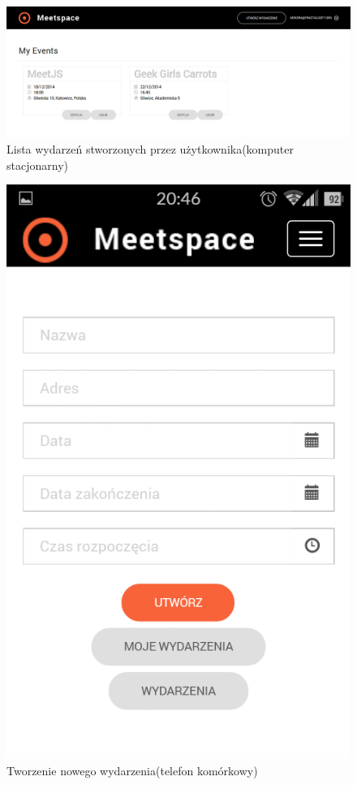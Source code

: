     \begin{figure}[h]
      \centering
      \includegraphics[scale=0.35]{images/my_events_pc.png}
      \caption{Lista wydarzeń stworzonych przez użytkownika(komputer stacjonarny)}
    \end{figure}

    \begin{figure}[h]
      \centering
      \includegraphics[scale=0.35]{images/new_event_phone.png}
      \caption{Tworzenie nowego wydarzenia(telefon komórkowy)}
    \end{figure}

